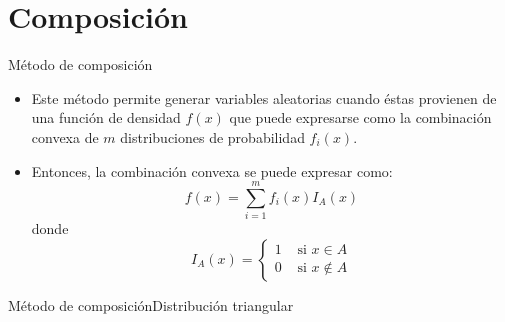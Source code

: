 \section{Composición}

\begin{frame}{Método de composición}
    \begin{itemize}
        \item  Este método permite generar variables aleatorias cuando éstas provienen de una función de densidad $f(x)$ que puede expresarse como la combinación convexa de $m$ distribuciones de probabilidad $f_i(x)$.
        \item Entonces, la combinación convexa se puede expresar como: \begin{equation*}
            f(x)=\sum_{i=1}^{m}{f_i(x)I_A(x)}
        \end{equation*} donde
        \begin{equation*}
            I_A(x)=\left\{\begin{array}{cc}
                1 & \text{ si } x \in A\\
                0 & \text{ si } x \notin A
            \end{array}\right.
        \end{equation*}
    \end{itemize} 
\end{frame}

\begin{frame}{Método de composición}{Distribución triangular}
    
\end{frame}
